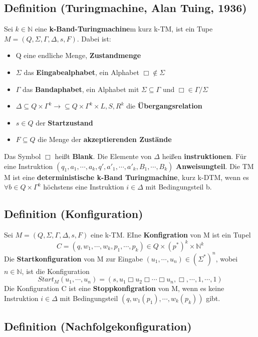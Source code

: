 \documentclass[a4paper,11pt]{article}
\begin{document}
\subsection{Definition (Turingmachine, Alan Tuing, 1936)} Sei $k \in \mathbb{N}$ eine \textbf{k-Band-Turingmachine}m kurz k-TM, ist ein Tupe $M = (Q, \Sigma, \varGamma, \Delta, s, F )$. Dabei ist:
\begin{itemize}
  \item Q eine endliche Menge, \textbf{Zustandmenge}
  \item $\Sigma$ das \textbf{Eingabealphabet}, ein Alphabet $\Box \not \in \Sigma$
  \item $\varGamma$ das \textbf{Bandaphabet}, ein Alphabet mit $\Sigma \subseteq \varGamma$ und $\Box \in \varGamma / \Sigma$ 
  \item $\Delta \subseteq Q \times \varGamma^{k} \rightarrow \subseteq Q \times \varGamma^{k} \times {L, S, R}^{k}$ die \textbf{Übergangsrelation}
  \item $s \in Q$ der \textbf{Startzustand}
  \item $F \subseteq Q$ die Menge der \textbf{akzeptierenden Zustände} 
\end{itemize}
\begin{sloppypar}
  \noindent Das Symbol $\Box$ heißt \textbf{Blank}. Die Elemente von $\Delta$ heißen \textbf{instruktionen}. Für eine Instruktion $(q_{1}, a_{1}, \cdots, a_{k}, q', a'_{1}, \cdots, a'_{k}, B_{1}, \cdots, B_{k})$ \textbf{Anweisungteil}. Die TM M ist eine \textbf{deterministische k-Band Turingmachine}, kurz k-DTM, wenn es $\forall b \in Q \times \varGamma^{k}$ höchstens eine Instruktion $i \in \Delta$ mit Bedingungsteil b.
\end{sloppypar}

\subsection{Definition (Konfiguration)} Sei $M = (Q, \Sigma, \Gamma, \Delta, s, F)$ eine k-TM. EIne \textbf{Konfigration} von M ist ein Tupel \[C = (q, w_{1}, \cdots, w_{k}, p_{1}, \cdots, p_{k}) \in Q \times (p^{*})^{k} \times \mathbb{N}^{k}\] Die \textbf{Startkonfiguration} von M zur Eingabe $(u_{1}, \cdots, u_{n}) \in (\Sigma^{*})^{n}$, wobei $n \in \mathbb{N}$, ist die Konfiguration \[Start_{M}(u_{1}, \cdots, u_{n}) = (s, u_{1} \Box u_{2} \Box \cdots \Box u_{n}, \Box, \cdots, 1, \cdots, 1)\] Die Konfiguration C ist eine \textbf{Stoppkonfigration} von M, wenn es keine Instruktion $i \in \Delta$ mit Bedingungsteil $(q, w_{1}(p_{1}), \cdots, w_{k}(p_{k}))$ gibt.

\subsection{Definition (Nachfolgekonfiguration)}
\end{document}
